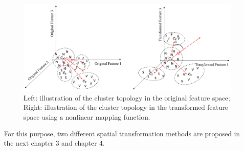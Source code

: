 \begin{figure}[h]
\centering
\includegraphics[scale=.5]{Fig/topo1.png}
\caption{Left: illustration of the cluster topology in the original feature space; Right: illustration of the cluster topology in the transformed feature space using a nonlinear mapping function.}
\label{fig:topo1}
\end{figure}

For this purpose, two different spatial transformation methods are proposed in the next chapter 3 and chapter 4.

